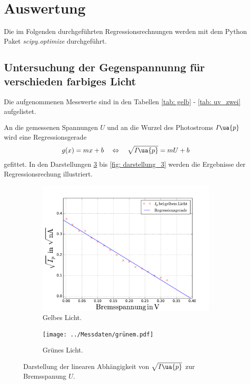 \section{Auswertung}

Die im Folgenden durchgeführten Regressionsrechnungen werden mit dem
Python Paket \emph{scipy.optimize}\cite{scipy} durchgeführt. %

\subsection{Untersuchung der Gegenspannunng für verschieden farbiges Licht}
Die aufgenommenen Messwerte sind in den Tabellen \ref{tab: gelb} - \ref{tab: uv_zwei} aufgelistet.






An die gemessenen Spannungen $U$ und an die Wurzel des Photostroms $I\ua{p}$ wird eine
Regressionsgerade
\begin{equation}
  \label{eq:reg} %
  g(x)=mx+b \quad \Leftrightarrow \quad \sqrt{I\ua{p}}=mU+b
\end{equation}
gefittet.
In den Darstellungen \ref{fig: darstellung_1} bis \ref{fig: darstellung_3} werden die Ergebnisse der Regressionsrechung
illustriert.
\begin{figure}
  \centering
  \begin{subfigure}{0.48\textwidth}
    \centering
    \includegraphics[width=1 \textwidth]{../Messdaten/gelbem.pdf}
    \caption{Gelbes Licht.}
    \label{fig: gelb}
  \end{subfigure}
  \begin{subfigure}{0.48\textwidth}
    \centering
    \texttt{[image: ../Messdaten/grünem.pdf]}
    \caption{Grünes Licht.}
    \label{fig: grün}
  \end{subfigure}
  \caption{Darstellung der linearen Abhängigkeit von $\sqrt{I\ua{p}}$ zur Bremsspanung $U$.}
  \label{fig: darstellung_1}
\end{figure}
